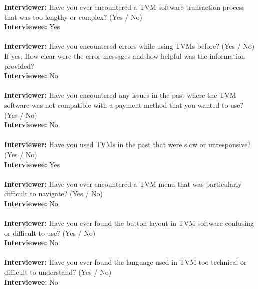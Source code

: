 \documentclass[a4paper,12pt]{report}
\begin{document}
\textbf{Interviewer:} Have you ever encountered a TVM software transaction process that was too lengthy or complex? (Yes / No)\\
\textbf{Interviewee:} Yes\\\\
\textbf{Interviewer:}  Have you encountered errors while using TVMs before? (Yes / No) If yes, How clear were the error messages and how helpful was the information provided?\\
\textbf{Interviewee:} No\\\\
\textbf{Interviewer:}  Have you encountered any issues in the past where the TVM software was not compatible with a payment method that you wanted to use? (Yes / No)\\
\textbf{Interviewee:} No\\\\
\textbf{Interviewer:}  Have you used TVMs in the past that were slow or unresponsive? (Yes / No)\\
\textbf{Interviewee:} Yes\\\\
\textbf{Interviewer:}  Have you ever encountered a TVM menu that was particularly difficult to navigate? (Yes / No)\\
\textbf{Interviewee:} No\\\\
\textbf{Interviewer:}  Have you ever found the button layout in TVM software confusing or difficult to use? (Yes / No) \\
\textbf{Interviewee:} No\\\\
\textbf{Interviewer:} Have you ever found the language used in TVM too technical or difficult to understand? (Yes / No) \\
\textbf{Interviewee:} No\\\\
 
\end{document}
